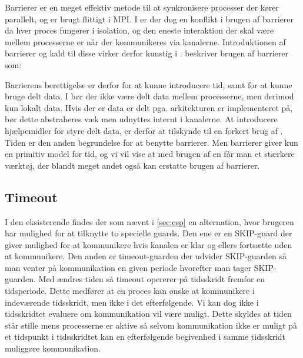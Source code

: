 Barrierer er en meget effektiv metode til at synkronisere processer der kører 
parallelt, og er brugt flittigt i MPI. I \csp er der dog en konflikt i brugen 
af barrierer da hver proces fungerer i isolation, og den eneste interaktion der 
skal være mellem processerne er når der kommunikeres via kanalerne. 
Introduktionen af barrierer og kald til disse virker derfor kunstig i \csp. 
\citeauthor{crew} beskriver brugen af barrierer som:


Barrierens berettigelse er derfor for at kunne introducere tid, samt for at kunne bruge delt data. I \csp bør der ikke være delt data mellem processerne, men derimod kun  lokalt data. Hvis der er data er delt pga. arkitekturen \csp er implementeret på, bør dette abstraheres væk men udnyttes internt i kanalerne. At introducere hjælpemidler for styre delt data, er derfor at tilskynde til en forkert brug af \csp. Tiden er den anden begrundelse for at benytte barrierer.
Men barrierer giver kun en  primitiv model for tid, og vi vil vise at med brugen af en \des får man et stærkere værktøj, der blandt meget andet også kan erstatte brugen af barrierer.

\subsection{Timeout} 
I den eksisterende \pycsp findes der som nævnt i \cref{sec:csp} en alternation, hvor brugeren har mulighed for at tilknytte to specielle guards. Den ene er en SKIP-guard der giver mulighed for at kommunikere hvis kanalen er klar og ellers fortsætte uden at kommunikere. Den anden er timeout-guarden der udvider SKIP-guarden så man venter på kommunikation en given periode hvorefter man tager SKIP-guarden. 
Med \des ændres tiden så timeout opererer på tidsskridt fremfor en tidsperiode. Dette medfører at en proces kan ønske at kommunikere i indeværende tidsskridt, men ikke i det efterfølgende.
Vi kan dog ikke i tidsskridtet evaluere om kommunikation vil være muligt. Dette skyldes at tiden står stille mens processerne er aktive så selvom kommunikation ikke er muligt på et tidspunkt i tidsskridtet kan en efterfølgende begivenhed i samme tidsskridt muliggøre kommunikation.

